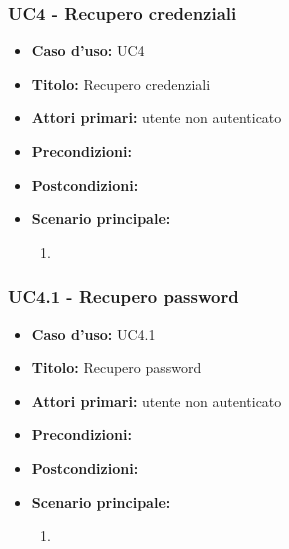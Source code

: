 \documentclass[casi-duso]{subfiles}
\begin{document}
\subsubsection{UC4 - Recupero credenziali}
\label{subsub:uc4utente}
\begin{itemize}
  \item \textbf{Caso d’uso:} UC4 
  \item \textbf{Titolo:} Recupero credenziali
  \item \textbf{Attori primari:} utente non autenticato
  \item \textbf{Precondizioni:} 
  \item \textbf{Postcondizioni:}
  \item \textbf{Scenario principale:} 
  \begin{enumerate}
    \item 
  \end{enumerate} 
\end{itemize}

\subsubsection{UC4.1 - Recupero password}
\label{subsub:uc4.1utente}
\begin{itemize}
  \item \textbf{Caso d’uso:} UC4.1 
  \item \textbf{Titolo:} Recupero password
  \item \textbf{Attori primari:} utente non autenticato
  \item \textbf{Precondizioni:} 
  \item \textbf{Postcondizioni:}
  \item \textbf{Scenario principale:} 
  \begin{enumerate}
    \item 
  \end{enumerate} 
\end{itemize}

\end{document}
